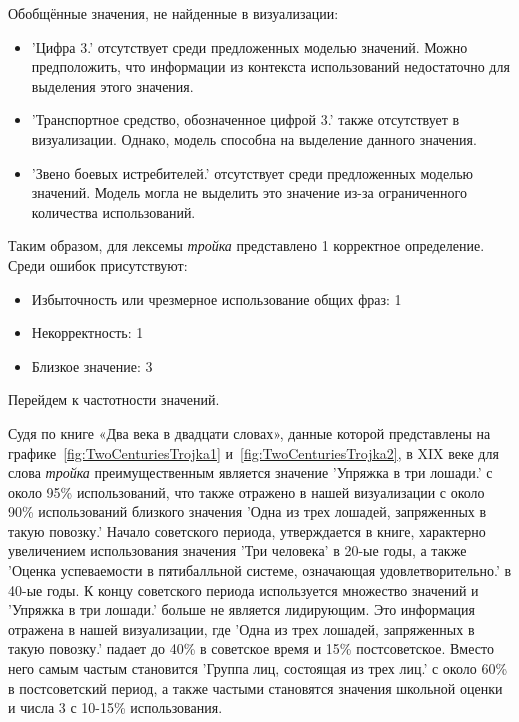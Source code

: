 \documentclass[LI,VKR]{HSEUniversity}
\begin{document}
Обобщённые значения, не найденные в визуализации:
\begin{itemize}
    \item ’Цифра 3.’ отсутствует среди предложенных моделью значений.  %
Можно предположить, что информации из контекста использований недостаточно для выделения этого значения.

    \item ’Транспортное средство, обозначенное цифрой 3.’ также отсутствует в визуализации.
Однако, модель способна на выделение данного значения.  %

    \item ’Звено боевых истребителей.’ отсутствует среди предложенных моделью значений.  %
Модель могла не выделить это значение из-за ограниченного количества использований.
\end{itemize}

Таким образом, для лексемы \textit{тройка} представлено 1 корректное определение.
Среди ошибок присутствуют:
\begin{itemize}
    \item Избыточность или чрезмерное использование общих фраз: 1
    \item Некорректность: 1
    \item Близкое значение: 3
\end{itemize}

Перейдем к частотности значений.

Судя по книге «Два века в двадцати словах»,
данные которой представлены на графике~\ref{fig:TwoCenturiesTrojka1} и~\ref{fig:TwoCenturiesTrojka2}, в XIX веке для слова \textit{тройка}
преимущественным является значение ’Упряжка в три лошади.’ с около 95\% использований,
что также отражено в нашей визуализации с около 90\% использований близкого значения
’Одна из трех лошадей, запряженных в такую повозку.’
Начало советского периода, утверждается в книге, характерно увеличением использования значения
’Три человека’ в 20-ые годы, а также ’Оценка успеваемости в пятибалльной системе, означающая удовлетворительно.’
в 40-ые годы.
К концу советского периода используется множество значений и
’Упряжка в три лошади.’ больше не является
лидирующим.
Это информация отражена в нашей визуализации, где ’Одна из трех лошадей, запряженных в такую повозку.’
падает до 40\% в советское время и 15\% постсоветское.
Вместо него самым частым становится ’Группа лиц, состоящая из трех лиц.’ с около 60\%
в постсоветский период, а также частыми становятся значения школьной оценки
и числа 3 с 10-15\% использования.
\end{document}
